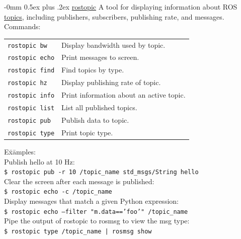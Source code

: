\documentclass[10pt,landscape]{article}
\makeatletter
\renewcommand{\subsection}{\@startsection{subsection}{2}{0mm}%
                                {-0mm}%
                                {0.5ex plus .2ex}%
                                {\normalfont\normalsize\bfseries}}
\newenvironment{nstabbing}
  {\setlength{\topsep}{1pt}%
   \setlength{\partopsep}{1pt}%
   \tabbing}
  {\endtabbing}
\makeatother
\begin{document}
\begin{multicols}{3}
\subsection{\href{http://wiki.ros.org/rostopic}{rostopic}}
\vspace{-1 mm}
A tool for displaying information about ROS \href{http://wiki.ros.org/Topics}{topics}, including publishers, subscribers, publishing rate, and messages.\\
Commands: \\
\begin{tabular}{p{\the\MyLen}%
                @{}p{\linewidth-\the\MyLen}@{}}
\texttt{rostopic bw}     & Display bandwidth used by topic. \\
\texttt{rostopic echo}   & Print messages to screen. \\
\texttt{rostopic find}   & Find topics by type. \\
\texttt{rostopic hz}     & Display publishing rate of topic. \\
\texttt{rostopic info}   & Print information about an active topic. \\
\texttt{rostopic list}   & List all published topics. \\
\texttt{rostopic pub}    & Publish data to topic. \\
\texttt{rostopic type}   & Print topic type. \\
\end{tabular}
\vspace{-1 mm}
\begin{nstabbing}
E\=x\=amples:\\
\> Publish hello at 10 Hz:\\
\> \>\texttt{\$ rostopic pub -r 10 /topic\_name std\_msgs/String hello}\\
\> Clear the screen after each message is published:\\
\> \>\texttt{\$ rostopic echo -c /topic\_name}\\
\> Display messages that match a given Python expression:\\
\> \>\texttt{\$ rostopic echo --filter "m.data=='foo'"  /topic\_name}\\
\> Pipe the output of rostopic to rosmsg to view the msg type:\\
\> \>\texttt{\$ rostopic type /topic\_name | rosmsg show}
\end{nstabbing}


\end{multicols}
\end{document}
